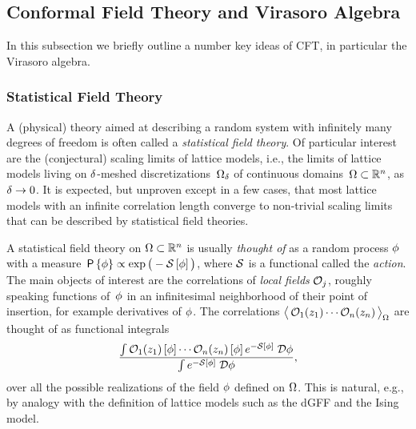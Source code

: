 \documentclass[12pt,oneside,english]{amsart}
\numberwithin{equation}{section}
\numberwithin{figure}{section}
\theoremstyle{plain}
\theoremstyle{plain}
\theoremstyle{plain}
\theoremstyle{plain}
\theoremstyle{remark}
\theoremstyle{definition}
\theoremstyle{plain}
\theoremstyle{plain}
\numberwithin{thm}{section}
\begin{document}
\subsection{\label{subsec:cft-and-virasoro-algebra} Conformal Field Theory and
Virasoro Algebra}

In this subsection we briefly outline a number key ideas of CFT,
in particular the Virasoro algebra.

\subsubsection{\label{subsec:statistical-field-theory}Statistical Field Theory}

A (physical) theory aimed at describing a random system with infinitely
many degrees of freedom is often called a \emph{statistical field
theory}. Of particular interest are the (conjectural) scaling limits of lattice
models, i.e., the limits of lattice models living on ${\delta}$-meshed
discretizations~${{\Omega}}_{{\delta}}$ of continuous 
domains~${\Omega}\subset \mathbb{R}^{n}$,
as~${\delta} \to 0$. It is expected, but unproven except in a few cases,
that most lattice models with an infinite correlation length
converge
to non-trivial scaling limits that can be described by statistical
field theories.

A statistical field theory on ${\Omega}\subset \mathbb{R}^{n}$ is usually
\emph{thought of }as a random process ${\phi}$ with a 
measure~$\mathsf{P}\left\{ {\phi}\right\} \propto 
\exp \big( -{\mathcal{S}}\left[{\phi}\right] \big)$,
where ${\mathcal{S}}$ is a functional called the \emph{action}.
The main objects of interest are the correlations of \emph{local fields}
\emph{${\mathcal{O}}_{j}$}, roughly speaking functions of~${\phi}$
in an infinitesimal neighborhood of their point of insertion,
for example derivatives of ${\phi}$.
The correlations 
$\big\langle\, { {\mathcal{O}}_{1}(z_{1})
    \cdots {\mathcal{O}}_{n}(z_{n}) } \, \big\rangle_{{\Omega}}$
are thought of as functional integrals 
\begin{equation}
\label{eq:functional-integrals}
\frac{\int\genoper_{1}(z_{1})
  \left[\genfield\right]\cdots\genoper_{n}(z_{n})
  \left[\genfield\right]e^{-\actn\left[\genfield\right]}
   \; \dpath{\genfield}}{%
  \int e^{-\actn\left[\genfield\right]} \; \dpath{\genfield}},
\end{equation}
over all the possible realizations of the field ${\phi}$ defined
on ${\Omega}$. This is natural, e.g., by analogy with the definition
of lattice models such as the dGFF and the Ising model.
\end{document}
